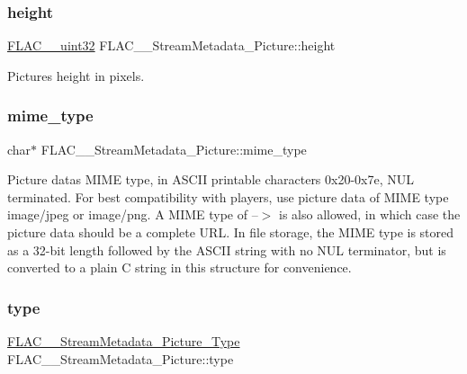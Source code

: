 \subsubsection{\texorpdfstring{height}{height}}
{\footnotesize\ttfamily \hyperlink{ordinals_8h_a9c4005ea7ef8d564b0cc993cdd0e4e5e}{F\+L\+A\+C\+\_\+\+\_\+uint32} F\+L\+A\+C\+\_\+\+\_\+\+Stream\+Metadata\+\_\+\+Picture\+::height}

Picture\textquotesingle{}s height in pixels. \mbox{\label{struct_f_l_a_c_____stream_metadata___picture_a9b4af2e10b627c0e79abf4cdd79f80e0}} 
\subsubsection{\texorpdfstring{mime\+\_\+type}{mime\_type}}
{\footnotesize\ttfamily char$\ast$ F\+L\+A\+C\+\_\+\+\_\+\+Stream\+Metadata\+\_\+\+Picture\+::mime\+\_\+type}

Picture data\textquotesingle{}s M\+I\+ME type, in A\+S\+C\+II printable characters 0x20-\/0x7e, N\+UL terminated. For best compatibility with players, use picture data of M\+I\+ME type {\ttfamily image/jpeg} or {\ttfamily image/png}. A M\+I\+ME type of \textquotesingle{}--$>$\textquotesingle{} is also allowed, in which case the picture data should be a complete U\+RL. In file storage, the M\+I\+ME type is stored as a 32-\/bit length followed by the A\+S\+C\+II string with no N\+UL terminator, but is converted to a plain C string in this structure for convenience. \mbox{\label{struct_f_l_a_c_____stream_metadata___picture_addc05a87a1da1ec7dd2301944ff2819c}} 
\subsubsection{\texorpdfstring{type}{type}}
{\footnotesize\ttfamily \hyperlink{group__flac__format_gaf6d3e836cee023e0b8d897f1fdc9825d}{F\+L\+A\+C\+\_\+\+\_\+\+Stream\+Metadata\+\_\+\+Picture\+\_\+\+Type} F\+L\+A\+C\+\_\+\+\_\+\+Stream\+Metadata\+\_\+\+Picture\+::type}

